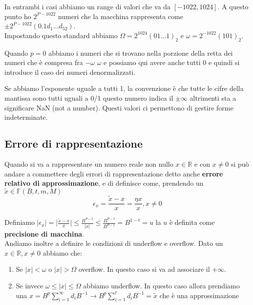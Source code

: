 \hspace{-15pt}In entrambi i casi abbiamo un range di valori che va da \([-1022, 1024]\). A questo punto ho \(2^{P-1022}\) numeri che la 
macchina rappresenta come \(\pm 2^{P - 1022}(0.1d_1 \dots d_{52})\).\\
Impostando questo standard abbiamo \(\Omega = 2^{1024}(01 \dots 1)_2\) e \(\omega = 2^{-1022} (101)_2\).\\

\begin{observation}
    Quando \(p=0\) abbiamo i numeri che si trovano nella porzione della retta dei numeri che è compresa fra \(-\omega\) \(\omega\)
    e possiamo qui avere anche tutti 0 e quindi si introduce il caso dei numeri denormalizzati.
\end{observation}

\hspace{-15pt}Se abbiamo l'esponente uguale a tutti 1, la convenzione è che tutte le cifre della mantissa sono tutti uguali a 0/1
questo numero indica il \(\pm \infty\) altrimenti sta a significare NaN (not a number). Questi valori ci permettono di gestire
forme indeterminate.

\subsection{Errore di rappresentazione}
Quando si va a rappresentare un numero reale non nullo \(x \in \mathbb{R}\) e con \(x \neq 0\) si può andare a commettere degli 
errori di rappresentazione detto anche \textbf{errore relativo di approssimazione}, e di definisce come, prendendo un \(\tilde{x} \in \mathbb{F}(B, t, m, M)\)
\[\epsilon_x = \frac{\tilde{x} - x}{x} = \frac{\eta x}{x}, x \neq 0\]

\hspace{-15pt}Definiamo \(|\epsilon_x| = \big | \frac{\tilde{x} - x}{x}\big | \leq \frac{B^{P-t}}{| x|} \leq \frac{B^{P - t}}{B^{P - 1}} = B^{1 - t} = u\)
la \(u\) è definita come \textbf{precisione di macchina}.\\

\hspace{-15pt}Andiamo inoltre a definire le condizioni di underflow e overflow. Dato un \(x \in \mathbb{R}, x \neq 0\) abbiamo che:
\begin{enumerate}
    \item Se \(|x| < \omega\) o \(|x| > \Omega\) overflow. In questo caso si va ad associare il \(+\infty\).
    \item Se invece \(\omega \leq |x| \leq \Omega\) abbiamo underflow. In questo caso allora prendiamo una \(x = B^p \sum_{i = 1}^{\infty}d_i B^{-1}
    \longrightarrow B^p \sum_{i=1}^{t}d_i B^{-1} = \tilde{x}\) che è una approssimazione 
\end{enumerate}

